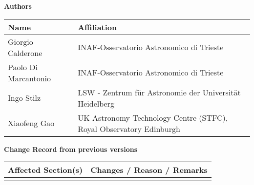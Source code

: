 \documentclass[12pt,a4paper]{article}
\begin{document}

\esoheader{}

\noindent
{\Large \bf Authors}
\medskip

\noindent
\begin{tabular}{ |p{}|p{}| }
  \hline
      {\bf Name} & {\bf Affiliation}\\
      \hline
      Giorgio Calderone     & INAF-Osservatorio Astronomico di Trieste \\
      Paolo Di Marcantonio  & INAF-Osservatorio Astronomico di Trieste \\
      Ingo Stilz            & LSW - Zentrum für Astronomie der Universität Heidelberg \\
      Xiaofeng Gao          & UK Astronomy Technology Centre (STFC), Royal Observatory Edinburgh\\
      \hline
\end{tabular}

\vspace{3cm}

\noindent
{\Large \bf Change Record from previous versions}
\medskip

\noindent
\begin{tabular}{ |p{}|p{}| }
  \hline
      {\bf Affected Section(s)} & {\bf Changes / Reason / Remarks}\\
      \hline
       & \\
      \hline
\end{tabular}

\newpage

\tableofcontents

\newpage





\newpage

\listofreq

\listofquestion


\label{LastPage}
\end{document}
